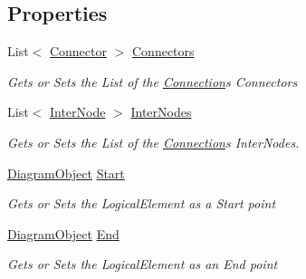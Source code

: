 \subsection*{Properties}
\begin{DoxyCompactItemize}
\item 
List$<$ \hyperlink{class_prototipo_t_f_g_1_1_connector}{Connector} $>$ \hyperlink{class_prototipo_t_f_g_1_1_connection_ae31ced5fee9c639c9351e8ba1aa9661b}{Connectors}
\begin{DoxyCompactList}\small\item\em Gets or Sets the List of the \hyperlink{class_prototipo_t_f_g_1_1_connection}{Connection}\textquotesingle{}s Connectors \end{DoxyCompactList}\item 
List$<$ \hyperlink{class_prototipo_t_f_g_1_1_inter_node}{Inter\+Node} $>$ \hyperlink{class_prototipo_t_f_g_1_1_connection_a7ccb8eb00691cd80d7650a0bb70d76db}{Inter\+Nodes}
\begin{DoxyCompactList}\small\item\em Gets or Sets the List of the \hyperlink{class_prototipo_t_f_g_1_1_connection}{Connection}\textquotesingle{}s Inter\+Nodes. \end{DoxyCompactList}\item 
\hyperlink{class_prototipo_t_f_g_1_1_diagram_object}{Diagram\+Object} \hyperlink{class_prototipo_t_f_g_1_1_connection_a9b681bd0aa7edc362b2a6f726ed460d9}{Start}
\begin{DoxyCompactList}\small\item\em Gets or Sets the Logical\+Element as a Start point \end{DoxyCompactList}\item 
\hyperlink{class_prototipo_t_f_g_1_1_diagram_object}{Diagram\+Object} \hyperlink{class_prototipo_t_f_g_1_1_connection_ab6be67647088f3becda41f2adda4bcd3}{End}
\begin{DoxyCompactList}\small\item\em Gets or Sets the Logical\+Element as an End point \end{DoxyCompactList}\end{DoxyCompactItemize}


